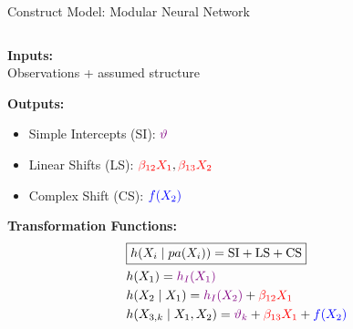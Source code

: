 \documentclass[onlytextwidth,english]{beamer}\usepackage[]{graphicx}\usepackage[]{xcolor}
\begin{document}
\begin{frame}{Construct Model: Modular Neural Network}

\begin{columns}

\begin{column}{0.65\textwidth}

\vspace{0.1cm}

\textbf{Inputs:} \\ Observations + assumed structure

\vspace{0.4cm}

\textbf{Outputs:}
\begin{itemize}
    \item Simple Intercepts (SI): $\textcolor{violet}{\vartheta}$
    \item Linear Shifts (LS): $\textcolor{red}{\beta_{12}X_1}, \textcolor{red}{\beta_{13}X_2}$
    \item Complex Shift (CS):  $\textcolor{blue}{f(X_2)}$
\end{itemize}

\vspace{0.4cm}
\textbf{Transformation Functions:}
\begin{align*}
& \boxed{h(X_i \mid pa(X_i)) = \text{SI} + \text{LS} + \text{CS}} \\
& h(X_1) = \textcolor{violet}{h_I(X_1)} \\
& h(X_2 \mid X_1) = \textcolor{violet}{h_I(X_2)} + \textcolor{red}{\beta_{12} X_1} \\
& h(X_{3,k} \mid X_1, X_2) = \textcolor{violet}{\vartheta_k} + \textcolor{red}{\beta_{13} X_1} + \textcolor{blue}{f(X_2)} 
\end{align*}

\end{column}


\end{columns}
\end{frame}
\end{document}
